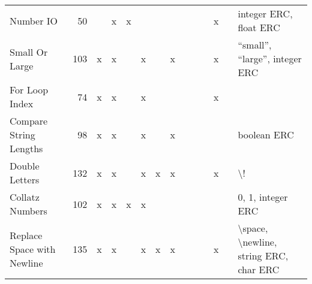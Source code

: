 \documentclass{sig-alternate}
\begin{document}
\begin{table*}
\begin{tabular}{>{\raggedright}p{2.6cm}rccccccccccc>{\raggedright}p{5.5cm}}
\midrule
Number IO                  & 50              &      & x       & x     &         &      &        &                    &                  &                   & x     &            & integer ERC, float ERC                                                                                                                                                                                                      \tabularnewline
Small Or Large             & 103             & x    & x       &       & x       &      & x      &                    &                  &                   & x     &            & ``small'', ``large'', integer ERC                                                                                                                                                                                               \tabularnewline
For Loop Index             & 74              & x    & x       &       & x       &      &        &                    &                  &                   & x     &            &                                                                                                                                                                                                                             \tabularnewline
Compare String Lengths     & 98              & x    & x       &       & x       &      & x      &                    &                  &                   &       &            & boolean ERC                                                                                                                                                                                                                 \tabularnewline
Double Letters             & 132             & x    & x       &       & x       & x    & x      &                    &                  &                   & x     &            & \textbackslash !                                                                                                                                                                                                            \tabularnewline
Collatz Numbers            & 102             & x    & x       & x     & x       &      &        &                    &                  &                   &       &            & 0, 1, integer ERC                                                                                                                                                                                                           \tabularnewline
Replace Space with Newline & 135             & x    & x       &       & x       & x    & x      &                    &                  &                   & x     &            & \textbackslash space, \textbackslash newline, string ERC, char ERC                                                                                                                                                          \tabularnewline

\end{tabular}
\end{table*}
\end{document}

